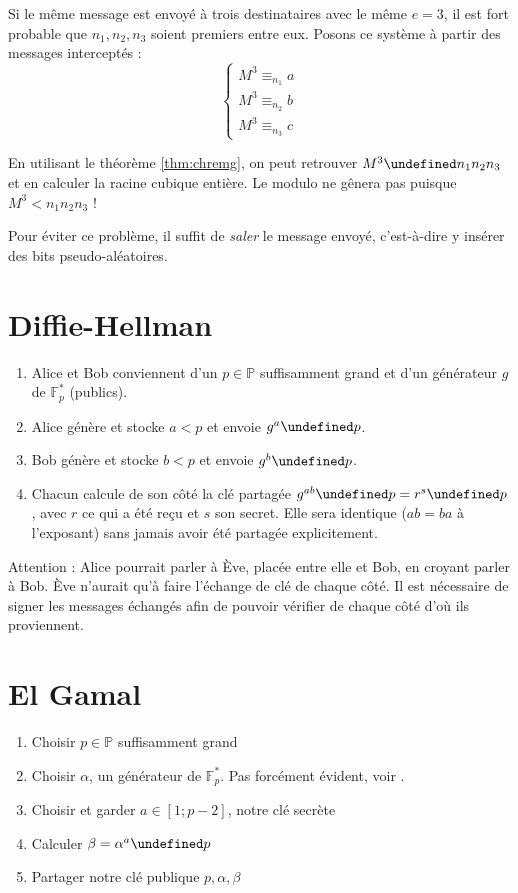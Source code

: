 \documentclass[11pt,twocolumn]{article}
\let\mod\undefined
\DeclareMathOperator{\mod}{mod}
\theoremstyle{plain}
\newcommand{\esP}{\mathbb{P}} %
\newcommand{\esF}{\mathbb{F}} %
\begin{document}
Si le même message est envoyé à trois destinataires avec le même $e=3$,
il est fort probable que $n_1,n_2,n_3$ soient premiers entre eux.
Posons ce système à partir des messages interceptés : \[\left\{\begin{array}{ll}
	M^3 \equiv_{n_1} a \\
	M^3 \equiv_{n_2} b \\
	M^3 \equiv_{n_3} c
\end{array}\right.\]

En utilisant le théorème \ref{thm:chremg},
on peut retrouver $M^3 \mod n_1n_2n_3$ et en calculer la racine cubique entière.
Le modulo ne gênera pas puisque $M^3<n_1n_2n_3$ !

Pour éviter ce problème, il suffit de \emph{saler} le message envoyé,
c'est-à-dire y insérer des bits pseudo-aléatoires.


\section{Diffie-Hellman}
\begin{enumerate}
	\item Alice et Bob conviennent d'un $p \in \esP$ suffisamment grand
		et d'un générateur $g$ de $\esF_p^*$ (publics).
	\item Alice génère et stocke $a<p$ et envoie $g^a \mod p$.
	\item Bob génère et stocke $b<p$ et envoie $g^b \mod p$.
	\item Chacun calcule de son côté la clé partagée
		$g^{ab} \mod p = r^s \mod p$,
		avec $r$ ce qui a été reçu et $s$ son secret.
		Elle sera identique ($ab=ba$ à l'exposant)
		sans jamais avoir été partagée explicitement.
\end{enumerate}

Attention : Alice pourrait parler à Ève, placée entre elle et Bob, en croyant
parler à Bob. Ève n'aurait qu'à faire l'échange de clé de chaque côté.
Il est nécessaire de signer les messages échangés
afin de pouvoir vérifier de chaque côté d'où ils proviennent.


\newpage
\section{El Gamal}
\begin{enumerate}
	\item Choisir $p \in \esP$ suffisamment grand
	\item Choisir $\alpha$, un générateur de $\esF_p^*$.
		Pas forcément évident, voir \cite[p. 163--164]{hac}.
	\item Choisir et garder $a \in [1;p-2]$, notre clé secrète
	\item Calculer $\beta=\alpha^a \mod p$
	\item Partager notre clé publique $p, \alpha, \beta$
\end{enumerate}
\end{document}
